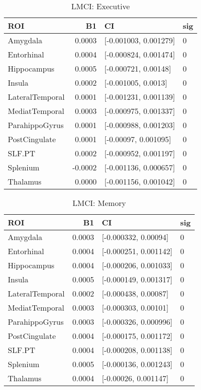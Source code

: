 \documentclass{article}
\begin{document}
\begin{table}[H]
\centering
\caption{LMCI: Executive} 
\begin{tabular}{lrll}
  \toprule
ROI & B1 & CI & sig \\ 
  \midrule
Amygdala & 0.0003 & [-0.001003, 0.001279] & 0 \\ 
  Entorhinal & 0.0004 & [-0.000824, 0.001474] & 0 \\ 
  Hippocampus & 0.0005 & [-0.000721, 0.00148] & 0 \\ 
  Insula & 0.0002 & [-0.001005, 0.0013] & 0 \\ 
  LateralTemporal & 0.0001 & [-0.001231, 0.001139] & 0 \\ 
  MediatTemporal & 0.0003 & [-0.000975, 0.001337] & 0 \\ 
  ParahippoGyrus & 0.0001 & [-0.000988, 0.001203] & 0 \\ 
  PostCingulate & 0.0001 & [-0.00097, 0.001095] & 0 \\ 
  SLF.PT & 0.0002 & [-0.000952, 0.001197] & 0 \\ 
  Splenium & -0.0002 & [-0.001136, 0.000657] & 0 \\ 
  Thalamus & 0.0000 & [-0.001156, 0.001042] & 0 \\ 
   \bottomrule
\end{tabular}
\end{table}%
\begin{table}[H]
\centering
\caption{LMCI: Memory} 
\begin{tabular}{lrll}
  \toprule
ROI & B1 & CI & sig \\ 
  \midrule
Amygdala & 0.0003 & [-0.000332, 0.00094] & 0 \\ 
  Entorhinal & 0.0004 & [-0.000251, 0.001142] & 0 \\ 
  Hippocampus & 0.0004 & [-0.000206, 0.001033] & 0 \\ 
  Insula & 0.0005 & [-0.000149, 0.001317] & 0 \\ 
  LateralTemporal & 0.0002 & [-0.000438, 0.00087] & 0 \\ 
  MediatTemporal & 0.0003 & [-0.000303, 0.00101] & 0 \\ 
  ParahippoGyrus & 0.0003 & [-0.000326, 0.000996] & 0 \\ 
  PostCingulate & 0.0004 & [-0.000175, 0.001172] & 0 \\ 
  SLF.PT & 0.0004 & [-0.000208, 0.001138] & 0 \\ 
  Splenium & 0.0005 & [-0.000136, 0.001243] & 0 \\ 
  Thalamus & 0.0004 & [-0.00026, 0.001147] & 0 \\ 
   \bottomrule
\end{tabular}
\end{table}
\end{document}
